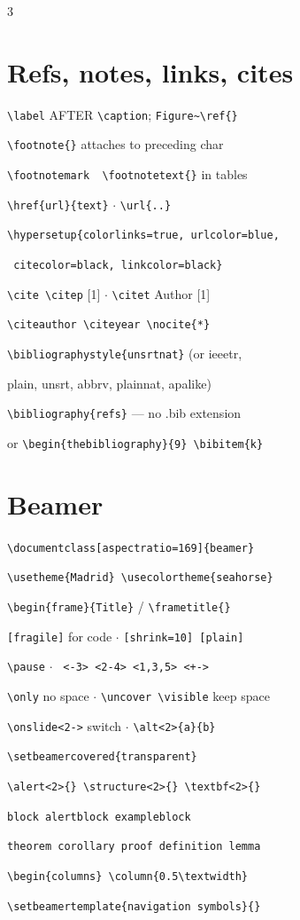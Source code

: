 \documentclass[a4paper]{article}
\newcommand{\C}[1]{\texttt{\footnotesize #1}}
\begin{document}
{\begin{multicols}{3}
\section{Refs, notes, links, cites}
\C{\textbackslash label} AFTER \C{\textbackslash caption}; \C{Figure\~{}\textbackslash ref\{\}}\par
\C{\textbackslash footnote\{\}} attaches to preceding char\par
\C{\textbackslash footnotemark \ \textbackslash footnotetext\{\}} in tables\par
\C{\textbackslash href\{url\}\{text\}} $\cdot$ \C{\textbackslash url\{..\}}\par
\C{\textbackslash hypersetup\{colorlinks=true, urlcolor=blue,}\par
\C{ citecolor=black, linkcolor=black\}}\par
\C{\textbackslash cite \textbackslash citep} [1] $\cdot$ \C{\textbackslash citet} Author [1]\par
\C{\textbackslash citeauthor \textbackslash citeyear \textbackslash nocite\{*\}}\par
\C{\textbackslash bibliographystyle\{unsrtnat\}} (or ieeetr,\par
\quad plain, unsrt, abbrv, plainnat, apalike)\par
\C{\textbackslash bibliography\{refs\}} --- no .bib extension\par
or \C{\textbackslash begin\{thebibliography\}\{9\} \textbackslash bibitem\{k\}}

\section{Beamer}
\C{\textbackslash documentclass[aspectratio=169]\{beamer\}}\par
\C{\textbackslash usetheme\{Madrid\} \textbackslash usecolortheme\{seahorse\}}\par
\C{\textbackslash begin\{frame\}\{Title\}} / \C{\textbackslash frametitle\{\}}\par
\C{[fragile]} for code $\cdot$ \C{[shrink=10] [plain]}\par
\C{\textbackslash pause} $\cdot$ \C{<3-> <-3> <2-4> <1,3,5> <+->}\par
\C{\textbackslash only} no space $\cdot$ \C{\textbackslash uncover \textbackslash visible} keep space\par
\C{\textbackslash onslide<2->} switch $\cdot$ \C{\textbackslash alt<2>\{a\}\{b\}}\par
\C{\textbackslash setbeamercovered\{transparent\}}\par
\C{\textbackslash alert<2>\{\} \textbackslash structure<2>\{\} \textbackslash textbf<2>\{\}}\par
\C{block alertblock exampleblock}\par
\C{theorem corollary proof definition lemma}\par
\C{\textbackslash begin\{columns\} \textbackslash column\{0.5\textbackslash textwidth\}}\par
\C{\textbackslash setbeamertemplate\{navigation symbols\}\{\}}


\end{multicols}}
\end{document}

